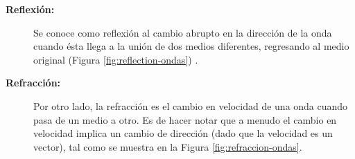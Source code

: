 \begin{description}
\item[\bf Reflexi\'on:] Se conoce como  reflexi\'on al cambio abrupto en la direcci\'on de la onda cuando \'esta llega a la uni\'on de dos medios diferentes, regresando al medio original (Figura \ref{fig:reflection-ondas}) . 

\item[\bf Refracci\'on:] Por otro lado, la refracci\'on es el cambio en velocidad de una onda
cuando pasa de un medio a otro. Es de hacer notar que a menudo el
cambio en velocidad implica un cambio de direcci\'on (dado que la
velocidad es un vector), tal como se muestra en la Figura
\ref{fig:refraccion-ondas}.

\begin{figure}[!h]
  \centering {}


\end{figure}
\end{description}
